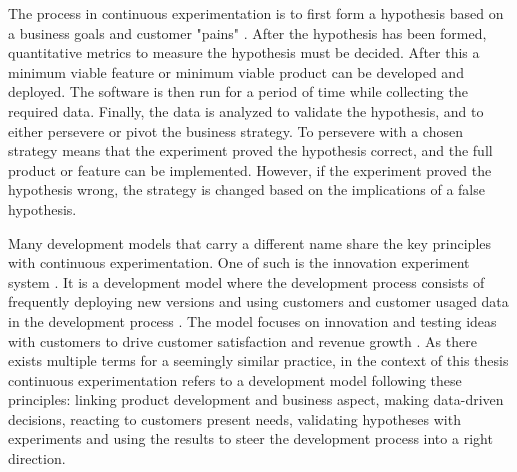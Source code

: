 \documentclass[english]{tktltiki2}
\theoremstyle{definition}
\theoremstyle{remark}
\begin{document}
The process in continuous experimentation is to first form a hypothesis based on a business goals and customer "pains" \cite{bosch2012building}. After the hypothesis has been formed, quantitative metrics to measure the hypothesis must be decided. After this a minimum viable feature or minimum viable product can be developed and deployed. The software is then run for a period of time while collecting the required data. Finally, the data is analyzed to validate the hypothesis, and to either persevere or pivot the business strategy. To persevere with a chosen strategy means that the experiment proved the hypothesis correct, and the full product or feature can be implemented. However, if the experiment proved the hypothesis wrong, the strategy is changed based on the implications of a false hypothesis.

Many development models that carry a different name share the key principles with continuous experimentation. One of such is the innovation experiment system \cite{bosch2012building}. It is a development model where the development process consists of frequently deploying new versions and using customers and customer usaged data in the development process \cite{bosch2012building}. The model focuses on innovation and testing ideas with customers to drive customer satisfaction and revenue growth \cite{bosch2012building}. As there exists multiple terms for a seemingly similar practice, in the context of this thesis continuous experimentation refers to a development model following these principles: linking product development and business aspect, making data-driven decisions, reacting to customers present needs, validating hypotheses with experiments and using the results to steer the development process into a right direction.%
\end{document}
